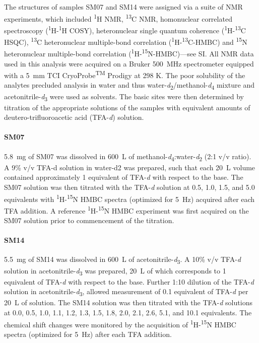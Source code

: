 \documentclass[9pt,lineno]{elife}
\begin{document}
The structures of samples SM07 and SM14 were assigned via a suite of NMR experiments, which included \textsuperscript{1}H NMR, \textsuperscript{13}C NMR, homonuclear correlated spectroscopy (\textsuperscript{1}H-\textsuperscript{1}H COSY), heteronuclear single quantum coherence (\textsuperscript{1}H-\textsuperscript{13}C HSQC), \textsuperscript{13}C heteronuclear multiple-bond correlation (\textsuperscript{1}H-\textsuperscript{13}C-HMBC) and \textsuperscript{15}N heteronuclear multiple-bond correlation (\textsuperscript{1}H-\textsuperscript{15}N-HMBC)---see SI. 
All NMR data used in this analysis were acquired on a Bruker 500~MHz spectrometer equipped with a 5~mm TCI CryoProbe\textsuperscript{TM} Prodigy at 298 K. 
The poor solubility of the analytes precluded analysis in water and thus water-\textit{d}\textsubscript{2}/methanol-\textit{d}\textsubscript{4} mixture and acetonitrile-\textit{d}\textsubscript{3} were used as solvents. 
The basic sites were then determined by titration of the appropriate solutions of the samples with equivalent amounts of deutero-trifluoroacetic acid (TFA-\textit{d}) solution.

\paragraph{SM07}

5.8~mg of SM07 was dissolved in 600~{\micro}L of methanol-\textit{d}\textsubscript{4}:water-\textit{d}\textsubscript{2} (2:1 v/v ratio). 
A 9\% v/v TFA-d solution in water-d2 was prepared, such that each 20~{\micro}L volume contained approximately 1 equivalent of TFA-\textit{d} with respect to the base.  
The SM07 solution was then titrated with the TFA-\textit{d} solution at 0.5, 1.0, 1.5, and 5.0 equivalents with \textsuperscript{1}H-\textsuperscript{15}N HMBC spectra (optimized for 5~Hz) acquired after each TFA addition. 
A reference \textsuperscript{1}H-\textsuperscript{15}N HMBC experiment was first acquired on the SM07 solution prior to commencement of the titration.

\paragraph{SM14}

5.5~mg of SM14 was dissolved in 600~{\micro}L of acetonitrile-\textit{d}\textsubscript{3}. 
A 10\% v/v TFA-\textit{d} solution in acetonitrile-\textit{d}\textsubscript{3} was prepared, 20~\micro L of which corresponds to 1 equivalent of TFA-\textit{d} with respect to the base.
Further 1:10 dilution of the TFA-\textit{d} solution in acetonitrile-\textit{d}\textsubscript{3}, allowed measurement of 0.1 equivalent of TFA-\textit{d} per 20~{\micro}L of solution.  
The SM14 solution was then titrated with the TFA-\textit{d} solutions at 0.0, 0.5, 1.0, 1.1, 1.2, 1.3, 1.5, 1.8, 2.0, 2.1, 2.6, 5.1, and 10.1 equivalents. 
The chemical shift changes were monitored by the acquisition of \textsuperscript{1}H-\textsuperscript{15}N HMBC spectra (optimized for 5~Hz) after each TFA addition.
\end{document}
